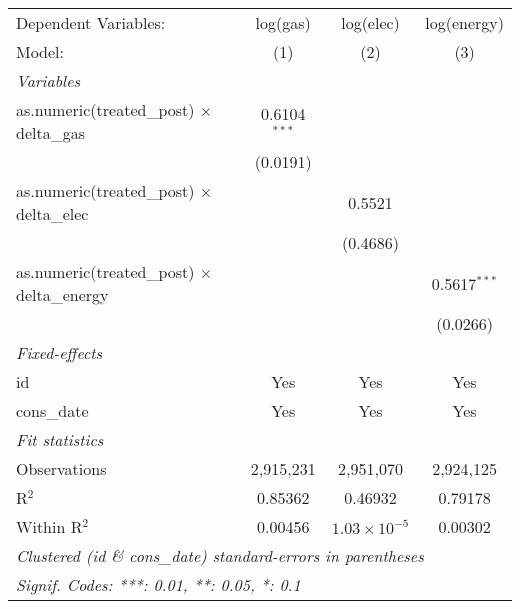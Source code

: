 
\begingroup
\centering
\begin{tabular}{lccc}
   \tabularnewline \midrule \midrule
   Dependent Variables:                                & log(gas)       & log(elec)             & log(energy)\\  
   Model:                                              & (1)            & (2)                   & (3)\\  
   \midrule
   \emph{Variables}\\
   as.numeric(treated\_post) $\times$ delta\_gas       & 0.6104$^{***}$ &                       &   \\   
                                                       & (0.0191)       &                       &   \\   
   as.numeric(treated\_post) $\times$ delta\_elec      &                & 0.5521                &   \\   
                                                       &                & (0.4686)              &   \\   
   as.numeric(treated\_post) $\times$ delta\_energy    &                &                       & 0.5617$^{***}$\\   
                                                       &                &                       & (0.0266)\\   
   \midrule
   \emph{Fixed-effects}\\
   id                                                  & Yes            & Yes                   & Yes\\  
   cons\_date                                          & Yes            & Yes                   & Yes\\  
   \midrule
   \emph{Fit statistics}\\
   Observations                                        & 2,915,231      & 2,951,070             & 2,924,125\\  
   R$^2$                                               & 0.85362        & 0.46932               & 0.79178\\  
   Within R$^2$                                        & 0.00456        & $1.03\times 10^{-5}$  & 0.00302\\  
   \midrule \midrule
   \multicolumn{4}{l}{\emph{Clustered (id \& cons\_date) standard-errors in parentheses}}\\
   \multicolumn{4}{l}{\emph{Signif. Codes: ***: 0.01, **: 0.05, *: 0.1}}\\
\end{tabular}
\par\endgroup


